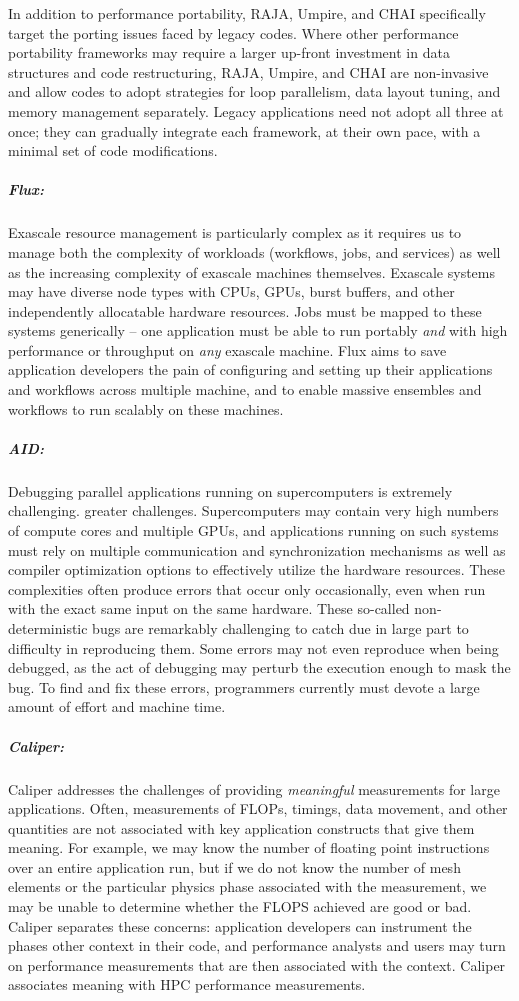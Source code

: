 In addition to performance portability, RAJA, Umpire, and CHAI
specifically target the porting issues faced by legacy codes.  Where
other performance portability frameworks may require a larger up-front
investment in data structures and code restructuring, RAJA, Umpire, and
CHAI are non-invasive and allow codes to adopt strategies for loop
parallelism, data layout tuning, and memory management separately.
Legacy applications need not adopt all three at once; they can gradually
integrate each framework, at their own pace, with a minimal set of code
modifications.

\subparagraph{Flux:}
Exascale resource management is particularly complex as it requires us to
manage both the complexity of workloads (workflows, jobs, and services)
as well as the increasing complexity of exascale machines themselves.
Exascale systems may have diverse node types with CPUs, GPUs, burst
buffers, and other independently allocatable hardware resources. Jobs
must be mapped to these systems generically -- one application must be
able to run portably {\it and} with high performance or throughput on
{\it any} exascale machine.  Flux aims to save application developers the
pain of configuring and setting up their applications and workflows
across multiple machine, and to enable massive ensembles and workflows to
run scalably on these machines.

\subparagraph{AID:}
Debugging parallel applications running on supercomputers is extremely
challenging.  greater challenges.  Supercomputers may contain very high
numbers of compute cores and multiple GPUs, and applications running on
such systems must rely on multiple communication and synchronization
mechanisms as well as compiler optimization options to effectively
utilize the hardware resources. These complexities often produce errors
that occur only occasionally, even when run with the exact same input on
the same hardware. These so-called non-deterministic bugs are remarkably
challenging to catch due in large part to difficulty in reproducing
them. Some errors may not even reproduce when being debugged, as the act
of debugging may perturb the execution enough to mask the bug.  To find
and fix these errors, programmers currently must devote a large amount of
effort and machine time.

\subparagraph{Caliper:}
Caliper addresses the challenges of providing {\it meaningful}
measurements for large applications.  Often, measurements of FLOPs,
timings, data movement, and other quantities are not associated with key
application constructs that give them meaning.  For example, we may know
the number of floating point instructions over an entire application run,
but if we do not know the number of mesh elements or the particular
physics phase associated with the measurement, we may be unable to
determine whether the FLOPS achieved are good or bad.  Caliper separates
these concerns: application developers can instrument the phases other
context in their code, and performance analysts and users may turn on
performance measurements that are then associated with the context.
Caliper associates meaning with HPC performance measurements.



